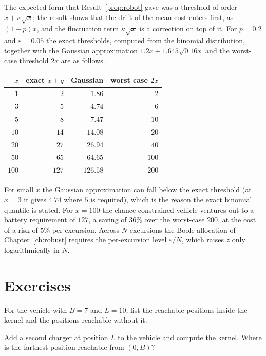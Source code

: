 The expected form that Result~\ref{prop:robot} gave was a threshold of order $x+\kappa\sqrt x$; the result shows that the drift of the mean cost enters first, as $(1+p)x$, and the fluctuation term $\kappa\sqrt x$ is a correction on top of it. For $p=0.2$ and $\varepsilon=0.05$ the exact thresholds, computed from the binomial distribution, together with the Gaussian approximation $1.2x+1.645\sqrt{0.16x}$ and the worst-case threshold $2x$ are as follows.
\begin{center}
\begin{tabular}{rrrr}
\toprule
$x$ & exact $x+q$ & Gaussian & worst case $2x$\\
\midrule
$1$ & $2$ & $1.86$ & $2$\\
$3$ & $5$ & $4.74$ & $6$\\
$5$ & $8$ & $7.47$ & $10$\\
$10$ & $14$ & $14.08$ & $20$\\
$20$ & $27$ & $26.94$ & $40$\\
$50$ & $65$ & $64.65$ & $100$\\
$100$ & $127$ & $126.58$ & $200$\\
\bottomrule
\end{tabular}
\end{center}
For small $x$ the Gaussian approximation can fall below the exact threshold (at $x=3$ it gives $4.74$ where $5$ is required), which is the reason the exact binomial quantile is stated. For $x=100$ the chance-constrained vehicle ventures out to a battery requirement of $127$, a saving of $36\%$ over the worst-case $200$, at the cost of a risk of $5\%$ per excursion. Across $N$ excursions the Boole allocation of Chapter~\ref{ch:robust} requires the per-excursion level $\varepsilon/N$, which raises $z$ only logarithmically in $N$.

\section*{Exercises}

\begin{exercise}
For the vehicle with $B=7$ and $L=10$, list the reachable positions inside the kernel and the positions reachable without it.
\end{exercise}

\begin{exercise}
Add a second charger at position $L$ to the vehicle and compute the kernel. Where is the farthest position reachable from $(0,B)$?
\end{exercise}

